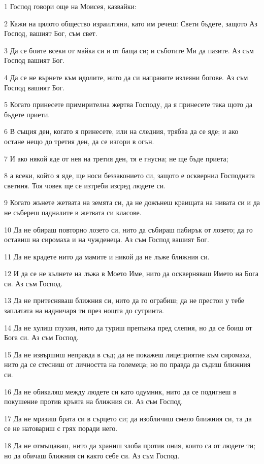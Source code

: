 \par 1 Господ говори още на Моисея, казвайки:
\par 2 Кажи на цялото общество израилтяни, като им речеш: Свети бъдете, защото Аз Господ, вашият Бог, съм свет.
\par 3 Да се боите всеки от майка си и от баща си; и съботите Ми да пазите. Аз съм Господ вашият Бог.
\par 4 Да се не върнете към идолите, нито да си направите излеяни богове. Аз съм Господ вашият Бог.
\par 5 Когато принесете примирителна жертва Господу, да я принесете така щото да бъдете приети.
\par 6 В същия ден, когато я принесете, или на следния, трябва да се яде; и ако остане нещо до третия ден, да се изгори в огън.
\par 7 И ако някой яде от нея на третия ден, тя е гнусна; не ще бъде приета;
\par 8 а всеки, който я яде, ще носи беззаконието си, защото е осквернил Господната светиня. Тоя човек ще се изтреби изсред людете си.
\par 9 Когато жънете жетвата на земята си, да не дожънеш краищата на нивата си и да не събереш падналите в жетвата си класове.
\par 10 Да не обираш повторно лозето си, нито да събираш пабирък от лозето; да го оставиш на сиромаха и на чужденеца. Аз съм Господ вашият Бог.
\par 11 Да не крадете нито да мамите и никой да не лъже ближния си.
\par 12 И да се не кълнете на лъжа в Моето Име, нито да оскверняваш Името на Бога си. Аз съм Господ.
\par 13 Да не притесняваш ближния си, нито да го ограбиш; да не престои у тебе заплатата на надничаря ти през нощта до сутринта.
\par 14 Да не хулиш глухия, нито да туриш препънка пред слепия, но да се боиш от Бога си. Аз съм Господ.
\par 15 Да не извършиш неправда в съд; да не покажеш лицеприятие към сиромаха, нито да се стесниш от личността на големеца; но по правда да съдиш ближния си.
\par 16 Да не обикаляш между людете си като одумник, нито да се подигнеш в покушение против кръвта на ближния си. Аз съм Господ.
\par 17 Да не мразиш брата си в сърцето си; да изобличиш смело ближния си, та да се не натовариш с грях поради него.
\par 18 Да не отмъщаваш, нито да храниш злоба против ония, които са от людете ти; но да обичаш ближния си както себе си. Аз съм Господ.
